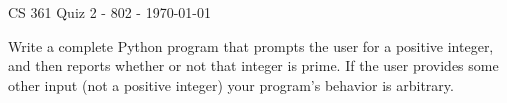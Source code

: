 \documentclass{exam}
\begin{document}
\begin{center}
	CS 361 Quiz 2 - 802 - \today
\end{center}

\vspace{1em}

\begin{center}
\end{center}

\begin{questions}
	
\question[10] Write a complete Python program that prompts the user for a positive integer, and then reports whether or not that integer is prime. If the user provides some other input (not a positive integer) your program's behavior is arbitrary.

\end{questions}
\end{document}
